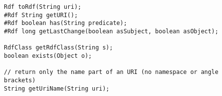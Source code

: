 \begin{small}
\begin{lstlisting}
Rdf toRdf(String uri);
#Rdf String getURI();
#Rdf boolean has(String predicate);
#Rdf long getLastChange(boolean asSubject, boolean asObject);

RdfClass getRdfClass(String s);
boolean exists(Object o);

// return only the name part of an URI (no namespace or angle brackets)
String getUriName(String uri);
\end{lstlisting}
\end{small}


